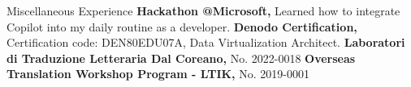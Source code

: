 \begin{rubric}{Miscellaneous Experience}
\entry*[2024] \textbf{Hackathon @Microsoft,} Learned how to integrate Copilot into my daily routine as a developer.
%
\entry*[2023] \textbf{Denodo Certification,} Certification code: DEN80EDU07A, Data Virtualization Architect.
%
\entry*[2022] \textbf{Laboratori di Traduzione Letteraria Dal Coreano,} No. 2022-0018
%
\entry*[2019] \textbf{Overseas Translation Workshop Program - LTIK,} No. 2019-0001
%
\end{rubric}